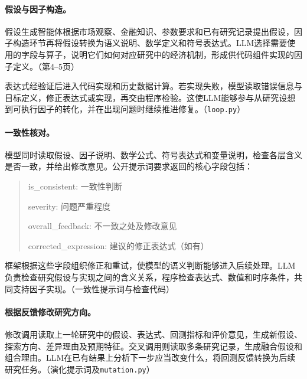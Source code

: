 \documentclass[11pt,a4paper,fontset=none]{ctexart}
\begin{document}
\paragraph{假设与因子构造。}
假设生成智能体根据市场观察、金融知识、参数要求和已有研究记录提出假设，因子构造环节再将假设转换为语义说明、数学定义和符号表达式。LLM选择需要使用的字段与算子，说明它们如何对应研究中的经济机制，形成供代码组件实现的因子定义。（第4--5页）

表达式经验证后进入代码实现和历史数据计算。若实现失败，模型读取错误信息与目标定义，修正表达式或实现，再交由程序检验。这使LLM能够参与从研究设想到可执行因子的转化，并在出现问题时继续推进修复。（\texttt{loop.py}）

\paragraph{一致性核对。}
模型同时读取假设、因子说明、数学公式、符号表达式和变量说明，检查各层含义是否一致，并给出修改意见。公开提示词要求返回的核心字段包括：

\begin{quote}\small\ttfamily
is\_consistent: 一致性判断\par
severity: 问题严重程度\par
overall\_feedback: 不一致之处及修改意见\par
corrected\_expression: 建议的修正表达式（如有）
\end{quote}

框架根据这些字段组织修正和重试，使模型的语义判断能够进入后续处理。LLM负责检查研究假设与实现之间的含义关系，程序检查表达式、数值和时序条件，共同支持因子实现。（一致性提示词与检查代码）

\paragraph{根据反馈修改研究方向。}
修改调用读取上一轮研究中的假设、表达式、回测指标和评价意见，生成新假设、探索方向、差异理由及预期特征。交叉调用则读取多条研究记录，生成融合假设和组合理由。LLM在已有结果上分析下一步应当改变什么，将回测反馈转换为后续研究任务。（演化提示词及\texttt{mutation.py}）
\end{document}
